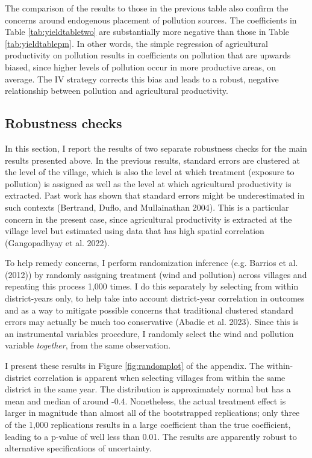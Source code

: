 \documentclass[
]{article}
\begin{document}
The comparison of the results to those in the previous table also confirm the concerns around endogenous placement of pollution sources. The coefficients in Table \ref{tab:yieldtabletwo} are substantially more negative than those in Table \ref{tab:yieldtablepm}. In other words, the simple regression of agricultural productivity on pollution results in coefficients on pollution that are upwards biased, since higher levels of pollution occur in more productive areas, on average. The IV strategy corrects this bias and leads to a robust, negative relationship between pollution and agricultural productivity.

\hypertarget{robustness-checks}{%
\subsection{Robustness checks}\label{robustness-checks}}

In this section, I report the results of two separate robustness checks for the main results presented above. In the previous results, standard errors are clustered at the level of the village, which is also the level at which treatment (exposure to pollution) is assigned as well as the level at which agricultural productivity is extracted. Past work has shown that standard errors might be underestimated in such contexts (Bertrand, Duflo, and Mullainathan 2004). This is a particular concern in the present case, since agricultural productivity is extracted at the village level but estimated using data that has high spatial correlation (Gangopadhyay et al. 2022).

To help remedy concerns, I perform randomization inference (e.g. Barrios et al. (2012)) by randomly assigning treatment (wind and pollution) across villages and repeating this process 1,000 times. I do this separately by selecting from within district-years only, to help take into account district-year correlation in outcomes and as a way to mitigate possible concerns that traditional clustered standard errors may actually be much too conservative (Abadie et al. 2023). Since this is an instrumental variables procedure, I randomly select the wind and pollution variable \emph{together}, from the same observation.

I present these results in Figure \ref{fig:randomplot} of the appendix. The within-district correlation is apparent when selecting villages from within the same district in the same year. The distribution is approximately normal but has a mean and median of around -0.4. Nonetheless, the actual treatment effect is larger in magnitude than almost all of the bootstrapped replications; only three of the 1,000 replications results in a large coefficient than the true coefficient, leading to a p-value of well less than 0.01. The results are apparently robust to alternative specifications of uncertainty.
\end{document}
